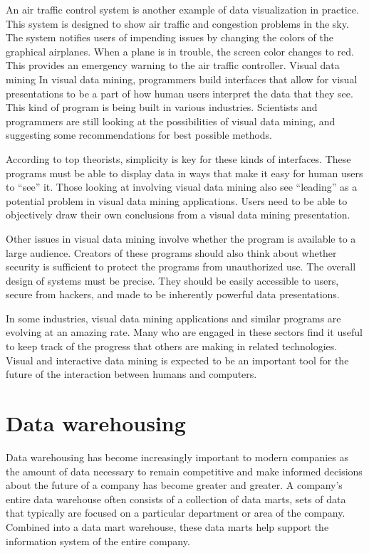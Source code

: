 An air traffic control system is another example of data visualization in practice. This system is designed to show air traffic and congestion problems in the sky. The system notifies users of impending issues by changing the colors of the graphical airplanes. When a plane is in trouble, the screen color changes to red. This provides an emergency warning to the air traffic controller.
Visual data mining
In visual data mining, programmers build interfaces that allow for visual presentations to be a part of how human users interpret the data that they see. This kind of program is being built in various industries. Scientists and programmers are still looking at the possibilities of visual data mining, and suggesting some recommendations for best possible methods.

According to top theorists, simplicity is key for these kinds of interfaces. These programs must be able to display data in ways that make it easy for human users to “see” it. Those looking at involving visual data mining also see “leading” as a potential problem in visual data mining applications. Users need to be able to objectively draw their own conclusions from a visual data mining presentation.

Other issues in visual data mining involve whether the program is available to a large audience. Creators of these programs should also think about whether security is sufficient to protect the programs from unauthorized use. The overall design of systems must be precise. They should be easily accessible to users, secure from hackers, and made to be inherently powerful data presentations.

In some industries, visual data mining applications and similar programs are evolving at an amazing rate. Many who are engaged in these sectors find it useful to keep track of the progress that others are making in related technologies. Visual and interactive data mining is expected to be an important tool for the future of the interaction between humans and computers.

\section{Data warehousing}
Data warehousing has become increasingly important to modern companies as the amount of data necessary to remain competitive and make informed decisions about the future of a company has become greater and greater. A company's entire data warehouse often consists of a collection of data marts, sets of data that typically are focused on a particular department or area of the company. Combined into a data mart warehouse, these data marts help support the information system of the entire company.

